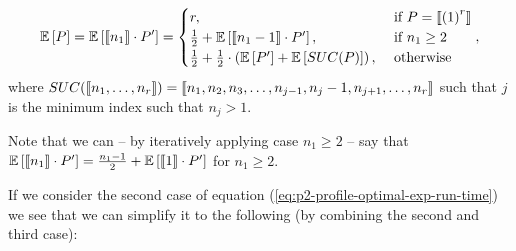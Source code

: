 \begin{equation}
  \label{eq:p2-profile-optimal-exp-run-time}
  \mathbb{E}\left[ P \right] =
  \mathbb{E}\left[ \left\llbracket n_1 \right\rrbracket \cdot P' \right] =
  \begin{cases}
    r, & \text{ if } P = \left\llbracket {(1)}^{r} \right\rrbracket \\
    \frac{1}{2} + \mathbb{E}\left[ \left\llbracket n_1-1 \right\rrbracket\cdot P' \right] , & \text{ if } n_1\geq 2 \\
    \frac{1}{2} + \frac{1}{2} \cdot \left( \mathbb{E}\left[ P' \right] + \mathbb{E}\left[ SUC(P) \right] \right) ,& \text{ otherwise } 
  \end{cases},
\end{equation}
where $SUC(\left\llbracket n_1,\dots,n_r \right\rrbracket) = \left\llbracket n_1, n_2, n_3,\dots,n_{j-1},n_j-1,n_{j+1},\dots,n_r \right\rrbracket$ such that $j$ is the minimum index such that $n_j>1$.

Note that we can -- by iteratively applying case $n_1\geq 2$ -- say that $\mathbb{E}\left[ \left\llbracket n_1 \right\rrbracket \cdot P' \right] = \frac{n_1-1}{2} + \mathbb{E}\left[ \left\llbracket 1 \right\rrbracket\cdot P' \right]$ for $n_1\geq 2$.

If we consider the second case of equation (\ref{eq:p2-profile-optimal-exp-run-time}) we see that we can simplify it to the following (by combining the second and third case):

